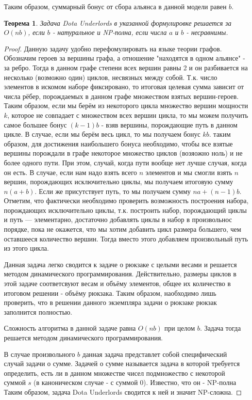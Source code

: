 \documentclass{article}
\newtheorem{theorem}{Теорема}
\begin{document}
Таким образом, суммарный бонус от сбора альянса в данной модели равен $b$. 

\begin{theorem}
    Задача Dota Underlords в указанной формулировке решается за $O(nb)$, если $b$ - натуральное и NP-полна, если числа $a$ и $b$ - несравнимы. 
\end{theorem}

\begin{proof}
 Данную задачу удобно перефомулировать на языке теории графов. Обозначим героев за вершины графа, а отношение "находятся в одном альянсе" - за ребро. Тогда в данном графе степени всех вершин равны 2 и он разбивается на несколько (возможно один) циклов, несвязных между собой. Т.к. число элементов в искомом наборе фиксировано, то итоговая целевая сумма зависит от числа рёбер, порождаемых в данном графе множеством взятых вершин-героев. Таким образом, если мы берём из некоторого цикла множество вершин мощности $k$, которое не совпадает с множеством всех вершин цикла, то мы можем получить самое большее бонус $(k-1)b$ - взяв вершины, порождающие путь в данном цикле. В случае, если мы берём весь цикл, то мы получаем бонус $kb$. таким образом, для достижения наибольшего бонуса необходимо, чтобы все взятые вершины порождали в графе некоторое множество циклов (возяожно ноль) и не более одного пути. При этом, случай, когда пути вообще нет лучше случая, когда он есть. В случае, если нам надо взять всего $n$ элементов и мы смогли взять $n$ вершин, порождающих исключительно циклы, мы получаем итоговую сумму $n(a+b)$. Если же присутствует путь, то мы получаем сумму $na+(n-1)b$. Отметим, что фактически необходимо проверить возможность построения набора, порождающих исключительно циклы, т.к. построить набор, порождающий циклы и путь --- элементарно, достаточно добавлять циклы в набор в произвольнос порядке, пока не окажется, что мы хотим добавить цикл размера большего, чем оставшееся количество вершин. Тогда вместо этого добавляем произвольный путь из этого цикла. 
 
 Данная задача легко сводится к задаче о рюкзаке с целыми весами и решается методом динамического программирования. Действительно, размеры циклов в этой задаче соответсвуют весам и объёму элементов, общее их количество в итоговом решении - объёму рюкзака. Таким образом, наобходимо лишь проверить, что в решении данного экземпляра задачи о рюкзаке рюкзак заполнится полностью.
 
 Сложность алгоритма  в данной задаче равна $O(nb)$ при целом $b$. Задача тогда решается методом динамического программирования.
 
 В случае произвольного $b$ данная задача представлет собой специфический случай задачи о сумме. Задачей о сумме называется задача в которой требуется определить, есть ли в данном множестве чисел подмножество с некоторой суммой $s$ (в каноническом случае - с суммой 0). Известно, что он - NP-полна Таким образом, задача Dota Underlords сводится к ней и значит NP-сложна. 
\end{proof}
\end{document}

